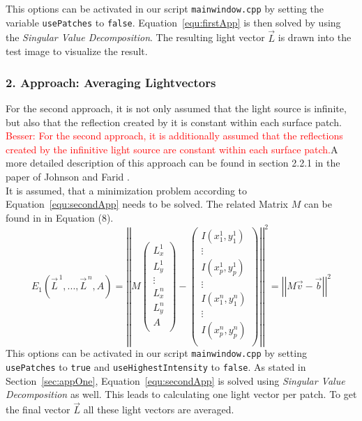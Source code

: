 This options can be activated in our script \texttt{mainwindow.cpp} by setting the variable \texttt{usePatches} to \texttt{false}. Equation~\ref{equ:firstApp} is then solved by using the \textit{Singular Value Decomposition}. The resulting light vector $\vec{L}$ is drawn into the test image to visualize the result.  

\subsubsection{2. Approach: Averaging Lightvectors}\label{sec:appTwo}

For the second approach, it is not only assumed that the light source is infinite, but also that the reflection created by it is constant within each surface patch. \textcolor{red}{Besser: For the second approach, it is additionally assumed that the reflections created by the infinitive light source are constant within each surface patch.}A more detailed description of this approach can be found in section 2.2.1 in the paper of Johnson and Farid \cite{Johnson}.\\
It is assumed, that a minimization problem according to Equation~\ref{equ:secondApp} needs to be solved. The related Matrix $M$ can be found in \cite{Johnson} in Equation (8). \\

\begin{equation}
\label{equ:secondApp}
E_{1}(\vec{L}^{\,1} , ... , \vec{L}^{\,n} , A) = 
\left\vert \left\vert 
M
\begin{pmatrix}
L^{1}_{x} \\
L^{1}_{y} \\
\vdots  \\
L^{n}_{x} \\
L^{n}_{y} \\
A \\
\end{pmatrix} -
\begin{pmatrix}
I(x^{1}_{1} , y^{1}_{1}) \\
\vdots  \\
I(x^{1}_{p} , y^{1}_{p}) \\
\vdots  \\
I(x^{n}_{1} , y^{n}_{1}) \\
\vdots  \\
I(x^{n}_{p} , y^{n}_{p}) \\
\end{pmatrix}
 \right\vert\right\vert^{2}
 = \left\vert \left\vert  M\vec{v}-\vec{b}  \right\vert\right\vert^{2}
\end{equation}
This options can be activated in our script \texttt{mainwindow.cpp} by setting \texttt{usePatches} to \texttt{true} and \texttt{useHighestIntensity} to \texttt{false}.
As stated in Section~\ref{sec:appOne}, Equation~\ref{equ:secondApp} is solved using \textit{Singular Value Decomposition} as well. This leads to calculating one light vector per patch. To get the final vector $\vec{L}$ all these light vectors are averaged.


